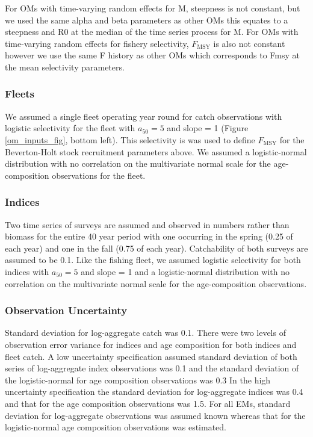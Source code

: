 \documentclass[
  12pt,
]{article}
\newcommand{\Fmsy}{\ensuremath{F_{\text{MSY}}}\xspace}
\begin{document}
For OMs with time-varying random effects for M, steepness is not
constant, but we used the same alpha and beta parameters as other OMs
this equates to a steepness and R0 at the median of the time series
process for M. For OMs with time-varying random effects for fishery
selectivity, \Fmsy is also not constant however we use the same F
history as other OMs which corresponds to Fmsy at the mean selectivity
parameters.

\hypertarget{fleets}{%
\subsubsection*{Fleets}\label{fleets}}

We assumed a single fleet operating year round for catch observations
with logistic selectivity for the fleet with \(a_{50} = 5\) and slope =
1 (Figure \ref{om_inputs_fig}, bottom left). This selectivity is was
used to define \Fmsy for the Beverton-Holt stock recruitment parameters
above. We assumed a logistic-normal distribution with no correlation on
the multivariate normal scale for the age-composition observations for
the fleet.

\hypertarget{indices}{%
\subsubsection*{Indices}\label{indices}}

Two time series of surveys are assumed and observed in numbers rather
than biomass for the entire 40 year period with one occurring in the
spring (0.25 of each year) and one in the fall (0.75 of each year).
Catchability of both surveys are assumed to be 0.1. Like the fishing
fleet, we assumed logistic selectivity for both indices with
\(a_{50} = 5\) and slope = 1 and a logistic-normal distribution with no
correlation on the multivariate normal scale for the age-composition
observations.

\hypertarget{observation-uncertainty}{%
\subsubsection*{Observation Uncertainty}\label{observation-uncertainty}}

Standard deviation for log-aggregate catch was 0.1. There were two
levels of observation error variance for indices and age composition for
both indices and fleet catch. A low uncertainty specification assumed
standard deviation of both series of log-aggregate index observations
was 0.1 and the standard deviation of the logistic-normal for age
composition observations was 0.3 In the high uncertainty specification
the standard deviation for log-aggregate indices was 0.4 and that for
the age composition observations was 1.5. For all EMs, standard
deviation for log-aggregate observations was assumed known whereas that
for the logistic-normal age composition observations was estimated.
\end{document}
